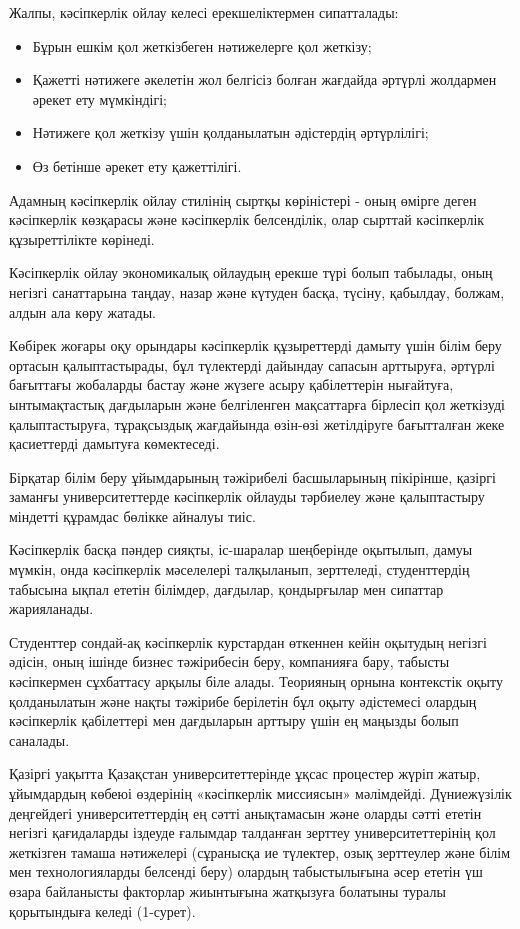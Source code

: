 Жалпы, кәсіпкерлік ойлау келесі ерекшеліктермен сипатталады:

\begin{itemize}
\item
  Бұрын ешкім қол жеткізбеген нәтижелерге қол жеткізу;
\item
  Қажетті нәтижеге әкелетін жол белгісіз болған жағдайда әртүрлі
  жолдармен әрекет ету мүмкіндігі;
\item
  Нәтижеге қол жеткізу үшін қолданылатын әдістердің әртүрлілігі;
\item
  Өз бетінше әрекет ету қажеттілігі.
\end{itemize}

Адамның кәсіпкерлік ойлау стилінің сыртқы көріністері - оның өмірге
деген кәсіпкерлік көзқарасы және кәсіпкерлік белсенділік, олар сырттай
кәсіпкерлік құзыреттілікте көрінеді.

Кәсіпкерлік ойлау экономикалық ойлаудың ерекше түрі болып табылады, оның
негізгі санаттарына таңдау, назар және күтуден басқа, түсіну, қабылдау,
болжам, алдын ала көру жатады.

Көбірек жоғары оқу орындары кәсіпкерлік құзыреттерді дамыту үшін білім
беру ортасын қалыптастырады, бұл түлектерді дайындау сапасын арттыруға,
әртүрлі бағыттағы жобаларды бастау және жүзеге асыру қабілеттерін
нығайтуға, ынтымақтастық дағдыларын және белгіленген мақсаттарға
бірлесіп қол жеткізуді қалыптастыруға, тұрақсыздық жағдайында өзін-өзі
жетілдіруге бағытталған жеке қасиеттерді дамытуға көмектеседі.

Бірқатар білім беру ұйымдарының тәжірибелі басшыларының пікірінше,
қазіргі заманғы университеттерде кәсіпкерлік ойлауды тәрбиелеу және
қалыптастыру міндетті құрамдас бөлікке айналуы тиіс.

Кәсіпкерлік басқа пәндер сияқты, іс-шаралар шеңберінде оқытылып, дамуы
мүмкін, онда кәсіпкерлік мәселелері талқыланып, зерттеледі,
студенттердің табысына ықпал ететін білімдер, дағдылар, қондырғылар мен
сипаттар жарияланады.

Студенттер сондай-ақ кәсіпкерлік курстардан өткеннен кейін оқытудың
негізгі әдісін, оның ішінде бизнес тәжірибесін беру, компанияға бару,
табысты кәсіпкермен сұхбаттасу арқылы біле алады. Теорияның орнына
контекстік оқыту қолданылатын және нақты тәжірибе берілетін бұл оқыту
әдістемесі олардың кәсіпкерлік қабілеттері мен дағдыларын арттыру үшін
ең маңызды болып саналады.

Қазіргі уақытта Қазақстан университеттерінде ұқсас процестер жүріп
жатыр, ұйымдардың көбеюі өздерінің «кәсіпкерлік миссиясын» мәлімдейді.
Дүниежүзілік деңгейдегі университеттердің ең сәтті анықтамасын және
оларды сәтті ететін негізгі қағидаларды іздеуде ғалымдар талданған
зерттеу университеттерінің қол жеткізген тамаша нәтижелері (сұранысқа ие
түлектер, озық зерттеулер және білім мен технологияларды белсенді беру)
олардың табыстылығына әсер ететін үш өзара байланысты факторлар
жиынтығына жатқызуға болатыны туралы қорытындыға келеді (1-сурет).

